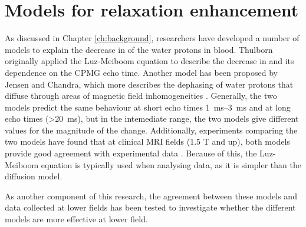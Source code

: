 \chapter{Models for \Ttwo relaxation enhancement}\label{ch:models}

As discussed in Chapter \ref{ch:background}, researchers have developed a number of models to explain the decrease in \Ttwo of the water protons in blood.
Thulborn originally applied the Luz-Meiboom equation to describe the decrease in \Ttwo and its dependence on the CPMG echo time\cite{ThulbornOxygenationdependencetransverse1982}.
Another model has been proposed by Jensen and Chandra, which more describes the dephasing of water protons that diffuse through areas of magnetic field inhomogeneities \cite{JensenNMRrelaxationtissues2000}.
Generally, the two models predict the same behaviour at short echo times \SIrange{1}{3}{ms} and at long echo times (\SI{>20}{ms})\cite{BrooksT2shorteningweaklymagnetized2001}, but in the intemediate range, the two models give different values for the magnitude of the \Ttwo change.
Additionally, experiments comparing the two models have found that at clinical MRI fields (1.5 T and up), both models provide good agreement with experimental data \cite{StefanovicHumanwholebloodrelaxometry2004,ChenHumanwholeblood2009,GardenerDependencebloodR22010,GrgacHematocritoxygenationdependence2013}.
Because of this, the Luz-Meiboom equation is typically used when analysing data, as it is simpler than the diffusion model.

As another component of this research, the agreement between these models and data collected at lower fields has been tested to investigate whether the different models are more effective at lower field.

